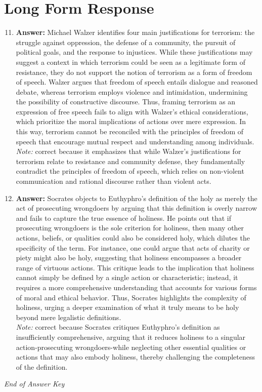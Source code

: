 \documentclass[12pt]{article}
\begin{document}
\section*{Long Form Response}
\begin{enumerate}[label=\arabic*.]
\setcounter{enumi}{10}
\item \textbf{Answer:} Michael Walzer identifies four main justifications for terrorism: the struggle against oppression, the defense of a community, the pursuit of political goals, and the response to injustices. While these justifications may suggest a context in which terrorism could be seen as a legitimate form of resistance, they do not support the notion of terrorism as a form of freedom of speech. Walzer argues that freedom of speech entails dialogue and reasoned debate, whereas terrorism employs violence and intimidation, undermining the possibility of constructive discourse. Thus, framing terrorism as an expression of free speech fails to align with Walzer's ethical considerations, which prioritize the moral implications of actions over mere expression. In this way, terrorism cannot be reconciled with the principles of freedom of speech that encourage mutual respect and understanding among individuals.
\\ \textit{Note:} correct because it emphasizes that while Walzer's justifications for terrorism relate to resistance and community defense, they fundamentally contradict the principles of freedom of speech, which relies on non-violent communication and rational discourse rather than violent acts.
\item \textbf{Answer:} Socrates objects to Euthyphro's definition of the holy as merely the act of prosecuting wrongdoers by arguing that this definition is overly narrow and fails to capture the true essence of holiness. He points out that if prosecuting wrongdoers is the sole criterion for holiness, then many other actions, beliefs, or qualities could also be considered holy, which dilutes the specificity of the term. For instance, one could argue that acts of charity or piety might also be holy, suggesting that holiness encompasses a broader range of virtuous actions. This critique leads to the implication that holiness cannot simply be defined by a single action or characteristic; instead, it requires a more comprehensive understanding that accounts for various forms of moral and ethical behavior. Thus, Socrates highlights the complexity of holiness, urging a deeper examination of what it truly means to be holy beyond mere legalistic definitions.
\\ \textit{Note:} correct because Socrates critiques Euthyphro's definition as insufficiently comprehensive, arguing that it reduces holiness to a singular action-prosecuting wrongdoers-while neglecting other essential qualities or actions that may also embody holiness, thereby challenging the completeness of the definition.
\end{enumerate}

\vfill
\noindent\textit{End of Answer Key}
\end{document}
